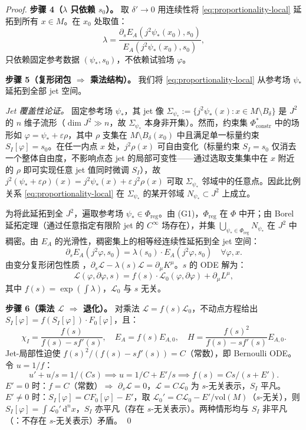 \documentclass[12pt,a4paper]{article}
\theoremstyle{definition}
\newcommand{\mL}{\mathcal{L}}
\newcommand{\mPhi}{\Phi}
\newcommand{\mreg}{\mPhi_{\mathrm{reg}}}
\newcommand{\vol}{\mathrm{vol}}
\newcommand{\diff}{\mathrm{d}}
\newcommand{\eps}{\varepsilon}
\newcommand{\chiI}{\chi_I}
\newcommand{\EA}{E_A}
\newcommand{\jphi}{j^2\varphi}
\newcommand{\dVol}{\,\diff^n x}
\begin{document}
\begin{proof}
\textbf{步骤 4（$\lambda$ 只依赖 $s_0$）。} 取 $\delta' \to 0$ 用连续性将 \eqref{eq:proportionality-local} 延拓到所有 $x \in M$。在 $x_0$ 处取值：
\[ \lambda = \frac{\partial_s \EA(j^2\psi_*(x_0), s_0)}{\EA(j^2\psi_*(x_0), s_0)}, \]
只依赖固定参考数据 $(\psi_*, s_0)$，不依赖试验场 $\varphi$。

\textbf{步骤 5（复形闭包 $\Rightarrow$ 乘法结构）。} 我们将 \eqref{eq:proportionality-local} 从参考场 $\psi_*$ 延拓到全部 jet 空间。

\emph{Jet 覆盖性论证。} 固定参考场 $\psi_*$，其 jet 像 $\Sigma_{\psi_*} := \{j^2\psi_*(x) : x \in M \setminus B_\delta\}$ 是 $J^2$ 的 $n$ 维子流形（$\dim J^2 \gg n$，故 $\Sigma_{\psi_*}$ 本身非开集）。然而，约束集 $\Phi^*_{\mathrm{constr}}$ 中的场形如 $\varphi = \psi_* + \eps\rho$，其中 $\rho$ 支集在 $M \setminus B_\delta(x_0)$ 中且满足单一标量约束 $S_I[\varphi] = s_0$。在任一内点 $x$ 处，$j^2\rho(x)$ 可自由变化（标量约束 $S_I = s_0$ 仅消去一个整体自由度，不影响点态 jet 的局部可变性——通过选取支集集中在 $x$ 附近的 $\rho$ 即可实现任意 jet 值同时微调 $S_I$），故 $j^2(\psi_* + \eps\rho)(x) = j^2\psi_*(x) + \eps\, j^2\rho(x)$ 可取 $\Sigma_{\psi_*}$ 邻域中的任意点。因此比例关系 \eqref{eq:proportionality-local} 在 $\Sigma_{\psi_*}$ 的某开邻域 $N_{\psi_*} \subset J^2$ 上成立。

为将此延拓到全 $J^2$，遍取参考场 $\psi_* \in \mreg$。由  (G1)，$\mreg$ 在 $\mPhi$ 中开；由 Borel 延拓定理（通过任意指定有限阶 jet 的 $C^\infty$ 场存在），并集 $\bigcup_{\psi_* \in \mreg} N_{\psi_*}$ 在 $J^2$ 中稠密。由 $\EA$ 的光滑性，稠密集上的相等经连续性延拓到全 jet 空间：
\[ \partial_s \EA(\jphi, s_0) = \lambda(s_0) \cdot \EA(\jphi, s_0) \quad \forall \varphi, x. \]
由变分复形闭包性质 \cite[定理 4.7]{Olver1993}，$\partial_s \mL - \lambda(s) \mL = \partial_\mu K^\mu$。$s$ 的 ODE 解为：
\[ \mL(\varphi, \partial\varphi, s) = f(s) \cdot \mL_0(\varphi, \partial\varphi) + \partial_\mu L^\mu, \]
其中 $f(s) = \exp(\int \lambda)$，$\mL_0$ 与 $s$ 无关。

\textbf{步骤 6（乘法 $\mL$ $\Rightarrow$ 退化）。} 对乘法 $\mL = f(s) \mL_0$，不动点方程给出 $S_I[\varphi] = f(S_I[\varphi]) \cdot F_0[\varphi]$，且：
\[ \chiI = \frac{f(s)}{f(s) - s f'(s)}, \quad \EA = f(s) E_{A,0}, \quad H = \frac{f(s)^2}{f(s) - s f'(s)} E_{A,0}. \]
Jet-局部性迫使 $f(s)^2/(f(s) - s f'(s)) = C$（常数），即 Bernoulli ODE。令 $u = 1/f$：
\[ u' + u/s = 1/(Cs) \implies u = 1/C + E'/s \implies f(s) = Cs/(s + E'). \]
$E' = 0$ 时：$f = C$（常数）$\Rightarrow$ $\partial_s \mL = 0$，$\mL = C\mL_0$ 为 $s$-无关表示，$S_I$ 平凡。$E' \neq 0$ 时：$S_I[\varphi] = C F_0[\varphi] - E'$，取 $\mL_0' = C\mL_0 - E'/\vol(M)$（$s$-无关），则 $S_I[\varphi] = \int \mL_0' \dVol$，$S_I$ 亦平凡（存在 $s$-无关表示）。两种情形均与 $S_I$ 非平凡（：不存在 $s$-无关表示）矛盾。 \qed
\end{proof}
\end{document}
